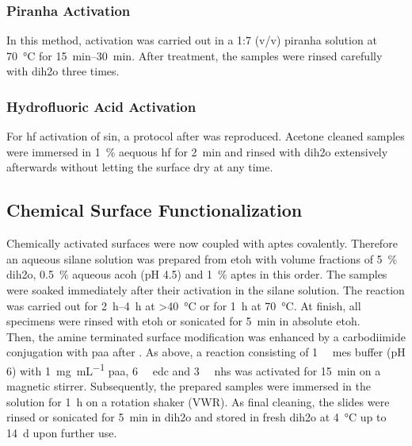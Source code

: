 \subsubsection{Piranha Activation}
In this method, activation was carried out in a 1:7 (v/v) piranha solution at \SI{70}{\degreeCelsius} for \SIrange{15}{30}{\minute}. After treatment, the samples were rinsed carefully with \gls{dih2o} three times.
\subsubsection{Hydrofluoric Acid Activation}
For \gls{hf} activation of \gls{sin}, a protocol after \citet{lit:chem:sin:surfacEtchingandMod} was reproduced. Acetone cleaned samples were immersed in \SI{1}{\percent} aequous \gls{hf} for \SI{2}{\minute} and rinsed with \gls{dih2o} extensively afterwards without letting the surface dry at any time.

\subsection{Chemical Surface Functionalization}
\label{sec:meth:surfFunc}
Chemically activated surfaces were now coupled with \gls{aptes} covalently. Therefore an aqueous silane solution was prepared from \gls{etoh} with volume fractions of \SI{5}{\percent} \gls{dih2o}, \SI{0.5}{\percent} aqueous \gls{acoh} (pH 4.5) and \SI{1}{\percent} \gls{aptes} in this order. The samples were soaked immediately after their activation in the silane solution. The reaction was carried out for \SIrange{2}{4}{\hour} at \SI{>40}{\degreeCelsius} or for \SI{1}{\hour} at \SI{70}{\degreeCelsius}. At finish, all specimens were rinsed with \gls{etoh} or sonicated for \SI{5}{\minute} in absolute \gls{etoh}.\\
Then, the amine terminated surface modification was enhanced by a carbodiimide conjugation with \gls{paa} after \citet{lit:Anti-EpCAM-PAA}. As above, a reaction consisting of \SI{1}{\milli\molar} \gls{mes} buffer (pH 6) with \SI{1}{\milli\gram\per\milli\liter} \gls{paa}, \SI{6}{\milli\molar} \gls{edc} and  \SI{3}{\milli\molar} \gls{nhs} was activated for \SI{15}{\minute} on a magnetic stirrer. Subsequently, the prepared samples were immersed in the solution for \SI{1}{\hour} on a rotation shaker (VWR). As final cleaning, the slides were rinsed or sonicated for \SI{5}{\minute} in \gls{dih2o} and stored in fresh \gls{dih2o} at \SI{4}{\degreeCelsius} up to \SI{14}{\day} upon further use.


